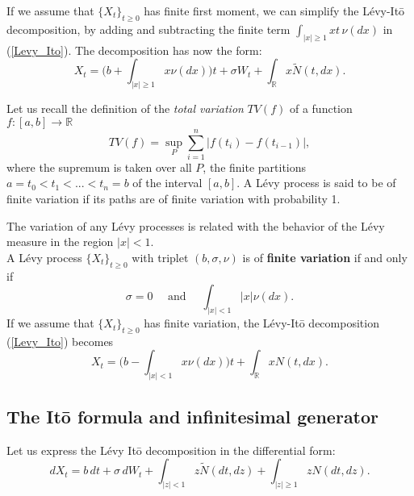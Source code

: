 \documentclass[a4paper,10pt]{article}
\newcommand{\numberset}{\mathbb}
\newcommand{\R}{\numberset{R}}
\begin{document}
If we assume that $\{X_t\}_{t \geq 0}$ has finite first moment, we can simplify the Lévy-It\={o} decomposition, 
by adding and subtracting the finite term $\int_{|x| \geq 1} x t\, \nu(dx)$ 
in (\ref{Levy_Ito}).
The decomposition has now the form:
\begin{equation}\label{Levy_Ito2}
 X_t = \biggl(  b+\int_{|x| \geq 1} x \nu(dx) \biggr)t + \sigma W_t + \int_{\R} x \tilde{N}(t,dx).
\end{equation}


Let us recall the definition of the \emph{total variation} $TV(f)$ of a function $f : [a,b] \to \R$
\begin{equation}
 TV(f) = \sup_P \sum_{i=1}^n |f(t_i) - f(t_{i-1})|,
\end{equation}
where the supremum is taken over all $P$, the finite partitions $a=t_0 < t_1 < ... < t_n = b$ of the interval $[a,b]$.
A Lévy process is said to be of finite variation if its paths are of finite variation with probability 1.

The variation of any Lévy processes is related with the behavior of the Lévy measure in the region $|x|<1$.\\
A Lévy process $\{X_t\}_{t \geq 0}$ with triplet $(b,\sigma,\nu)$ is of \textbf{finite variation} if and only if
\begin{equation}
 \sigma = 0 \quad \mbox{ and } \quad \int_{|x| < 1} |x| \nu(dx). 
\end{equation}
\noindent
If we assume that $\{X_t\}_{t \geq 0}$ has finite variation, the Lévy-It\={o} decomposition (\ref{Levy_Ito}) 
becomes
\begin{equation}\label{Levy_Ito3}
 X_t = \biggl(  b-\int_{|x| < 1} x \nu(dx) \biggr)t + \int_{\R} x N(t,dx).
\end{equation}


\subsection{The It\={o} formula and infinitesimal generator} 

Let us express the Lévy It\=o decomposition in the differential form:
\begin{equation}\label{Levy_Ito22}
  dX_t = b\,dt + \sigma \, dW_t + \int_{|z|<1} z \tilde{N}(dt,dz) + \int_{|z|\geq1} z N(dt,dz).
\end{equation}
\end{document}

